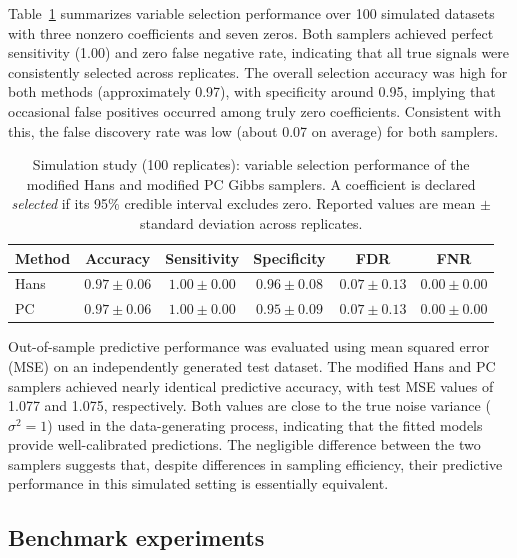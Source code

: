 Table~\ref{tab:sim_varsel} summarizes variable selection performance over 100 simulated datasets with three nonzero coefficients and seven zeros. Both samplers achieved perfect sensitivity (1.00) and zero false negative rate, indicating that all true signals were consistently selected across replicates. The overall selection accuracy was high for both methods (approximately 0.97), with specificity around 0.95, implying that occasional false positives occurred among truly zero coefficients. Consistent with this, the false discovery rate was low (about 0.07 on average) for both samplers.





\begin{table}[ht]
\centering
\begin{tabular}{lccccc}
\hline
Method & Accuracy & Sensitivity & Specificity & FDR & FNR  \\
\hline
Hans & $0.97 \pm 0.06$ & $1.00 \pm 0.00$ & $0.96 \pm 0.08$ & $0.07 \pm 0.13$ & $0.00 \pm 0.00$ \\
PC   & $0.97 \pm 0.06$ & $1.00 \pm 0.00$ & $0.95 \pm 0.09$ & $0.07 \pm 0.13$ & $0.00 \pm 0.00$ \\
\hline
\end{tabular}
\caption{Simulation study (100 replicates): variable selection performance of the modified Hans and modified PC Gibbs samplers. A coefficient is declared \emph{selected} if its 95\% credible interval excludes zero. Reported values are mean $\pm$ standard deviation across replicates.}
\label{tab:sim_varsel}
\end{table}



Out-of-sample predictive performance was evaluated using mean squared error (MSE) on an independently generated test dataset. 
The modified Hans and PC samplers achieved nearly identical predictive accuracy, with test MSE values of 1.077 and 1.075, respectively. 
Both values are close to the true noise variance ($\sigma^2 = 1$) used in the data-generating process, indicating that the fitted models provide well-calibrated predictions. 
The negligible difference between the two samplers suggests that, despite differences in sampling efficiency, their predictive performance in this simulated setting is essentially equivalent.



\subsection{Benchmark experiments}\label{sec:benchmark_study}


